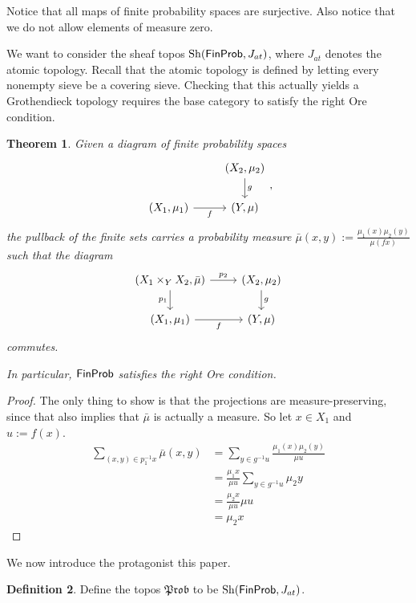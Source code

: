 \documentclass[a4paper]{amsproc}
\theoremstyle{plain}
\newtheorem{theorem}{Theorem}[section]
\theoremstyle{definition}
\newtheorem{definition}[theorem]{Definition}
\theoremstyle{remark}
\numberwithin{equation}{section}
\DeclareMathOperator{\Sh}{Sh}
\newcommand{\FinProb}{\textup{\textsf{FinProb}}}
\newcommand{\Prob}{\mathfrak{Prob}}
\begin{document}
Notice that all maps of finite probability spaces are surjective. Also notice that we do not allow elements of measure zero.

We want to consider the sheaf topos $\Sh(\FinProb, J_{at})$, where $J_{at}$ denotes the atomic topology. Recall that the atomic topology is defined by letting every nonempty sieve be a covering sieve. Checking that this actually yields a Grothendieck topology requires the base category to satisfy the right Ore condition.

\begin{theorem} \label{pullbackMeasure}
Given a diagram of finite probability spaces
\[
\begin{tikzcd}
                               & {(X_2,\mu_2)} \arrow[d, "g"] \\
{(X_1, \mu_1)} \arrow[r, "f"'] & {(Y,\mu)}
\end{tikzcd},
\]
the pullback of the finite sets carries a probability measure $\bar{\mu}(x,y) := \frac{\mu_1(x) \mu_2(y)}{\mu(f x)}$ such that the diagram
\[
\begin{tikzcd}
{(X_1 \times_Y X_2, \bar{\mu})} \arrow[d, "p_1"'] \arrow[r, "p_2"] & {(X_2,\mu_2)} \arrow[d, "g"] \\
{(X_1, \mu_1)} \arrow[r, "f"']                               & {(Y,\mu)}
\end{tikzcd}
\]
commutes.

In particular, $\FinProb$ satisfies the right Ore condition.
\end{theorem}
\begin{proof}
The only thing to show is that the projections are measure-preserving, since that also implies that $\bar{\mu}$ is actually a measure. So let $x \in X_1$ and $u := f(x)$.
\begin{align*}
\sum_{(x,y) \in p_1^{-1} x} \bar{\mu}(x,y) &= \sum_{y \in g^{-1} u} \frac{\mu_1(x)\mu_2(y)}{\mu u} \\
&= \frac{\mu_1 x}{\mu u} \sum_{y \in g^{-1} u} \mu_2 y \\
&= \frac{\mu_2 x}{\mu u} \mu u \\
&= \mu_2 x
\end{align*}
\end{proof}

We now introduce the protagonist this paper.

\begin{definition}
Define the topos $\Prob$ to be $\Sh(\FinProb, J_{at})$.
\end{definition}
\end{document}
